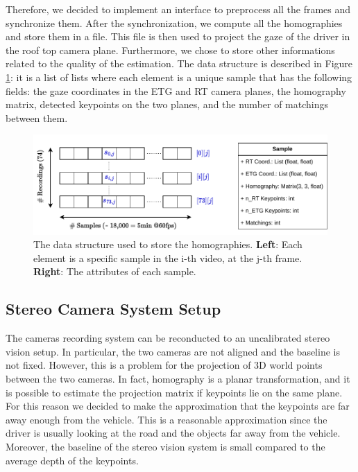 Therefore, we decided to implement 
an interface to preprocess all the frames and synchronize them.
After the synchronization, we compute all the homographies and store them in a 
file. This file is then used to project the gaze of the driver in the roof top 
camera plane.
Furthermore, we chose to store other informations related to the quality of the 
estimation.
The data structure is described in Figure \ref{fig:homography_data_structure}:
it is a list of lists where each element is a unique sample that has the 
following fields: the gaze coordinates in the ETG and RT camera planes, the 
homography matrix, detected keypoints on the two planes, and the number of 
matchings between them.

\begin{figure}
    \centering
    \includegraphics[width=\textwidth]{images/dreyeve/homography_data_structure.pdf}
    \caption[Data structure to store homographies]
    {The data structure used to store the homographies.
    \textbf{Left}: Each element is a specific sample in the i-th video, at 
    the j-th frame.
    \textbf{Right}: The attributes of each sample.}
    \label{fig:homography_data_structure}
\end{figure}

\subsection{Stereo Camera System Setup}
The cameras recording system can be reconducted to an uncalibrated stereo vision 
setup. In particular, the two cameras are not aligned and the baseline is not 
fixed. However, this is a problem for the projection of 3D world points between 
the two cameras. In fact, homography is a planar transformation, 
and it is possible to estimate the projection matrix if keypoints lie on the 
same plane.
For this reason we decided to make the approximation that the 
keypoints are far away enough from the vehicle. This is a reasonable 
approximation since the driver is usually looking at the road and the objects 
far away from the vehicle. Moreover, the baseline of the stereo vision system is 
small compared to the average depth of the keypoints.

